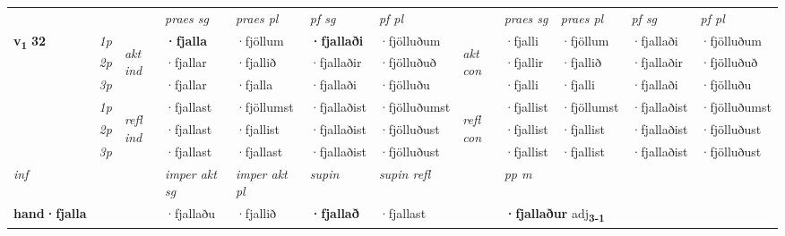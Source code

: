 \begin{longtable}[l]{X>{\footnotesize\itshape}llXXXXlXXXX}
\midrule

 & &   & \textit{praes sg}  & \textit{praes pl}    & \textit{ pf sg} & \textit{pf pl} & & \textit{praes sg}  & \textit{praes pl}    & \textit{pf sg} & \textit{pf pl }  \\ \cmidrule{4-7} \cmidrule{9-12}
 \multirow{2}{*}{{{\textbf{v{\textsubscript{1}}} \Large{\textbf{32}}}}}  & 1p & \multirow{3}{*}{\begin{turn}{90}\textit{akt ind}\end{turn}} & \textbf{·fjalla} & ·fjöllum & \textbf{·fjallaði} & ·fjölluðum & \multirow{3}{*}{\begin{turn}{90}\textit{akt con}\end{turn}} &·fjalli & ·fjöllum & ·fjallaði & ·fjölluðum\\*
 & 2p &  &  ·fjallar  & ·fjallið & ·fjallaðir & ·fjölluðuð & & ·fjallir & ·fjallið & ·fjallaðir & ·fjölluðuð \\*
 & 3p &  & ·fjallar & ·fjalla & ·fjallaði & ·fjölluðu & & ·fjalli & ·fjalli& ·fjallaði & ·fjölluðu \\*
\cmidrule{4-7} \cmidrule{9-12}
 & 1p & \multirow{3}{*}{\begin{turn}{90}\textit{refl ind}\end{turn}}  & ·fjallast & ·fjöllumst & ·fjallaðist & ·fjölluðumst & \multirow{3}{*}{\begin{turn}{90}\textit{refl con}\end{turn}}  &·fjallist & ·fjöllumst & ·fjallaðist & ·fjölluðumst \\*
 & 2p &  & ·fjallast & ·fjallist & ·fjallaðist & ·fjölluðust & &·fjallist & ·fjallist & ·fjallaðist & ·fjölluðust \\*
 & 3p  & & ·fjallast & ·fjallast & ·fjallaðist & ·fjölluðust & & ·fjallist & ·fjallist& ·fjallaðist & ·fjölluðust \\*
\cmidrule{4-7} \cmidrule{9-12}

   {\textit{inf}} & &  & \textit{imper akt sg} & \textit{imper akt pl}    & \textit{supin} & \textit{supin refl} && \textit{pp m} \\*
  {\textbf{hand\allowbreak ·fjalla}} & && ·fjallaðu  & ·fjallið    &  \textbf{·fjallað} & ·fjallast && \multicolumn{2}{l}{\textbf{·fjallaður} adj\textbf{\textsubscript{3-1}}} \\*

\midrule


\end{longtable}
